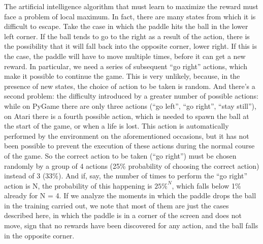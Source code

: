 The artificial intelligence algorithm that must learn to maximize the reward
must face a problem of local maximum. In fact, there are many states from
which it is difficult to escape. Take the case in which the paddle hits the
ball in the lower left corner. If the ball tends to go to the right as a result
of the action, there is the possibility that it will fall back into the
opposite corner, lower right. If this is the case, the paddle will have to move
multiple times, before it can get a new reward. In particular, we need a series
of subsequent ``go right'' actions, which make it possible to continue the game.
This is very unlikely, because, in the presence of new states, the choice of
action to be taken is random. And there's a second problem: the difficulty
introduced by a greater number of possible actions: while on PyGame there are
only three actions (``go left'', ``go right'', ``stay still''), on Atari there is a
fourth possible action, which is needed to spawn the ball at the start of the
game, or when a life is lost. This action is automatically performed by the
environment on the aforementioned occasions, but it has not been possible to
prevent the execution of these actions during the normal course of the game.
So the correct action to be taken (``go right'') must be chosen randomly by a
group of 4 actions (25\% probability of choosing the correct action) instead
of 3 (33\%). And if, say, the number of times to perform the ``go right'' action
is N, the probability of this happening is $25\%^N$, which falls below
1\% already for N = 4. If we analyze the moments in which the paddle drops the
ball in the training carried out, we note that most of them are just the cases
described here, in which the paddle is in a corner of the screen and does not
move, sign that no rewards have been discovered for any action, and the ball
falls in the opposite corner.

